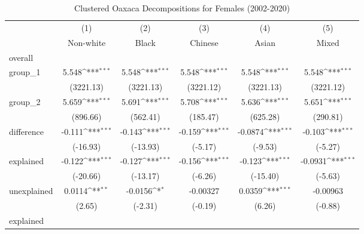 \begin{table}[htbp]\centering
\def\sym#1{\ifmmode^{#1}\else\(^{#1}\)\fi}
\caption{Clustered Oaxaca Decompositions for Females (2002-2020)\label{tab1}}
\begin{tabular}{l*{5}{c}}
\hline\hline
            &\multicolumn{1}{c}{(1)}&\multicolumn{1}{c}{(2)}&\multicolumn{1}{c}{(3)}&\multicolumn{1}{c}{(4)}&\multicolumn{1}{c}{(5)}\\
            &\multicolumn{1}{c}{Non-white}&\multicolumn{1}{c}{Black}&\multicolumn{1}{c}{Chinese}&\multicolumn{1}{c}{Asian}&\multicolumn{1}{c}{Mixed}\\
\hline
overall     &                     &                     &                     &                     &                     \\
group\_1     &       5.548\sym{***}&       5.548\sym{***}&       5.548\sym{***}&       5.548\sym{***}&       5.548\sym{***}\\
            &   (3221.13)         &   (3221.13)         &   (3221.12)         &   (3221.13)         &   (3221.12)         \\
group\_2     &       5.659\sym{***}&       5.691\sym{***}&       5.708\sym{***}&       5.636\sym{***}&       5.651\sym{***}\\
            &    (896.66)         &    (562.41)         &    (185.47)         &    (625.28)         &    (290.81)         \\
difference  &      -0.111\sym{***}&      -0.143\sym{***}&      -0.159\sym{***}&     -0.0874\sym{***}&      -0.103\sym{***}\\
            &    (-16.93)         &    (-13.93)         &     (-5.17)         &     (-9.53)         &     (-5.27)         \\
explained   &      -0.122\sym{***}&      -0.127\sym{***}&      -0.156\sym{***}&      -0.123\sym{***}&     -0.0931\sym{***}\\
            &    (-20.66)         &    (-13.17)         &     (-6.26)         &    (-15.40)         &     (-5.63)         \\
unexplained &      0.0114\sym{**} &     -0.0156\sym{*}  &    -0.00327         &      0.0359\sym{***}&    -0.00963         \\
            &      (2.65)         &     (-2.31)         &     (-0.19)         &      (6.26)         &     (-0.88)         \\
\hline
explained   &                     &                     &                     &                     &                     \\

\end{tabular}
\end{table}
